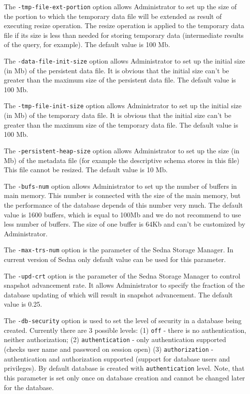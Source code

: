\documentclass[a4paper,12pt]{article}
\begin{document}
The \verb!-tmp-file-ext-portion! option allows Administrator to set up the size of the portion to which the temporary data file will be extended as result of executing resize operation. The resize operation is applied to the temporary data file if its size is less than needed for storing temporary data (intermediate results of the query, for example). The default value is 100 Mb.

The \verb!-data-file-init-size! option allows Administrator to set up the initial size (in Mb) of the persistent data file. It is obvious that the initial size can't be greater than the maximum size of the persistent data file. The default value is 100 Mb.

The \verb!-tmp-file-init-size! option allows Administrator to set up the initial size (in Mb) of the temporary data file. It is obvious that the initial size can't be greater than the maximum size of the temporary data file. The default value is 100 Mb.

The \verb!-persistent-heap-size! option allows Administrator to set up the size (in Mb) of the metadata file (for example the descriptive schema stores in this file) This file cannot be resized. The default value is 10 Mb.

The \verb!-bufs-num! option allows Administrator to set up the number of buffers in main memory. This number is connected with the size of the main memory, but the performance of the database depends of this number very much. The default value is 1600 buffers, which is equal to 100Mb and we do not recommend to use less number of buffers. The size of one buffer is 64Kb and can't be customized by Administrator.

The \verb!-max-trs-num! option is the parameter of the Sedna Storage Manager. In current version of Sedna only default value can be used for this parameter.

The \verb!-upd-crt! option is the parameter of the Sedna Storage Manager to control snapshot advancement rate. It allows Administrator to specify the fraction of the database updating of which will result in snapshot advancement. The default value is 0.25.

The \verb!-db-security! option is used to set the level of security in a database being created. Currently there are 3 possible levels: (1) \verb!off! - there is no authentication, neither authorization; (2) \verb!authentication! - only authentication supported (checks user name and password on session open) (3) \verb!authorization! - authentication and authorization supported (support for database users and privileges). By default database is created with \verb!authentication! level. Note, that this parameter is set only once on database creation and cannot be changed later for the database.
\end{document}
